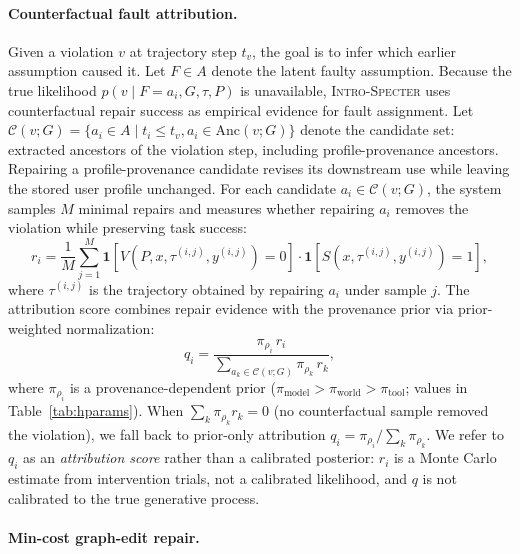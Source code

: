 \documentclass{article}
\newcommand{\method}{\textsc{Intro-Specter}\xspace}
\newcommand{\Anc}{\mathrm{Anc}}
\begin{document}
\paragraph{Counterfactual fault attribution.}\label{sec:attribution} Given a violation $v$ at trajectory step $t_v$, the goal is to infer which earlier assumption caused it. Let $F \in A$ denote the latent faulty assumption. Because the true likelihood $p(v \mid F{=}a_i, G, \tau, P)$ is unavailable, \method uses counterfactual repair success as empirical evidence for fault assignment. Let $\mathcal{C}(v; G) = \{a_i \in A \mid t_i \leq t_v, a_i \in \Anc(v;G)\}$ denote the candidate set: extracted ancestors of the violation step, including profile-provenance ancestors. Repairing a profile-provenance candidate revises its downstream use while leaving the stored user profile unchanged. For each candidate $a_i \in \mathcal{C}(v; G)$, the system samples $M$ minimal repairs and measures whether repairing $a_i$ removes the violation while preserving task success:
\begin{equation}
  r_i = \frac{1}{M} \sum_{j=1}^{M} \mathbf{1}[V(P,x,\tau^{(i,j)},y^{(i,j)})=0] \cdot \mathbf{1}[S(x,\tau^{(i,j)},y^{(i,j)})=1],\label{eq:repair-evidence}
\end{equation}
where $\tau^{(i,j)}$ is the trajectory obtained by repairing $a_i$ under sample $j$. The attribution score combines repair evidence with the provenance prior via prior-weighted normalization:
\begin{equation}
  q_i = \frac{\pi_{\rho_i}\, r_i}{\sum_{a_k \in \mathcal{C}(v;G)} \pi_{\rho_k}\, r_k},\label{eq:attribution}
\end{equation}
where $\pi_{\rho_i}$ is a provenance-dependent prior ($\pi_{\text{model}} > \pi_{\text{world}} > \pi_{\text{tool}}$; values in Table~\ref{tab:hparams}). When $\sum_k \pi_{\rho_k} r_k = 0$ (no counterfactual sample removed the violation), we fall back to prior-only attribution $q_i = \pi_{\rho_i} / \sum_k \pi_{\rho_k}$. We refer to $q_i$ as an \emph{attribution score} rather than a calibrated posterior: $r_i$ is a Monte Carlo estimate from intervention trials, not a calibrated likelihood, and $q$ is not calibrated to the true generative process.

\paragraph{Min-cost graph-edit repair.}\label{sec:mcgr}
\end{document}
